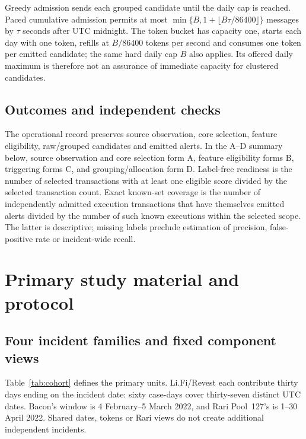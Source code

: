 \documentclass[preprint,12pt,authoryear]{elsarticle}
\begin{document}
Greedy admission sends each grouped candidate until the daily cap is reached. Paced cumulative admission permits at most $\min\{B,1+\lfloor B\tau/86400\rfloor\}$ messages by $\tau$ seconds after UTC midnight. The token bucket has capacity one, starts each day with one token, refills at $B/86400$ tokens per second and consumes one token per emitted candidate; the same hard daily cap $B$ also applies. Its offered daily maximum is therefore not an assurance of immediate capacity for clustered candidates.

\subsection{Outcomes and independent checks}
The operational record preserves source observation, core selection, feature eligibility, raw/grouped candidates and emitted alerts. In the A--D summary below, source observation and core selection form A, feature eligibility forms B, triggering forms C, and grouping/allocation form D. Label-free readiness is the number of selected transactions with at least one eligible score divided by the selected transaction count. Exact known-set coverage is the number of independently admitted execution transactions that have themselves emitted alerts divided by the number of such known executions within the selected scope. The latter is descriptive; missing labels preclude estimation of precision, false-positive rate or incident-wide recall.

\section{Primary study material and protocol}\label{sec:material}
\subsection{Four incident families and fixed component views}
Table~\ref{tab:cohort} defines the primary units. Li.Fi/Revest each contribute thirty days ending on the incident date: sixty case-days cover thirty-seven distinct UTC dates. Bacon's window is 4 February--5 March 2022, and Rari Pool~127's is 1--30 April 2022. Shared dates, tokens or Rari views do not create additional independent incidents.
\end{document}
